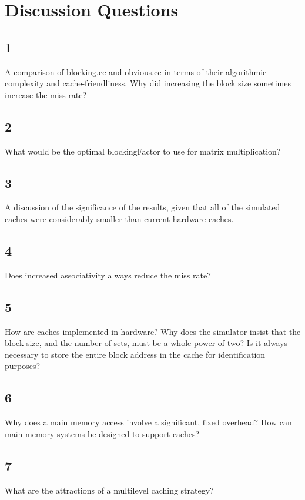 \documentclass[letterpaper, 12pt, oneside]{memoir}
\begin{document}
\section{Discussion Questions}
\subsection{1}
A comparison of blocking.cc and obvious.cc in terms of their algorithmic 
complexity and cache-friendliness. Why did increasing the block size sometimes 
increase the miss rate?


\subsection{2}
What would be the optimal blockingFactor to use for matrix multiplication?


\subsection{3}
A discussion of the significance of the results, given that all of the simulated
caches were considerably smaller than current hardware caches.


\subsection{4}
Does increased associativity always reduce the miss rate?


\subsection{5}
How are caches implemented in hardware? Why does the simulator insist that the
block size, and the number of sets, must be a whole power of two? Is it always
necessary to store the entire block address in the cache for identification purposes?


\subsection{6}
Why does a main memory access involve a significant, fixed overhead? How can 
main memory systems be designed to support caches?


\subsection{7}
What are the attractions of a multilevel caching strategy?
\end{document}
